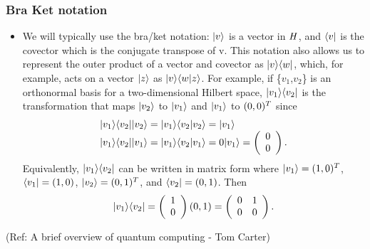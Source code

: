  \begin{frame}[fragile]\frametitle{Bra Ket notation}

\begin{itemize}
	\item We will typically use the bra/ket notation: \newline
		$ |{v}\rangle $ is a vector in $\mathit{H}$, and \newline
		$ \langle{v}| $ is the covector which is the conjugate transpose of v. \newline
		This notation also allows us to represent the outer product of a vector and
		covector as $|{v}\rangle \langle{w}|$, which, for example, acts on a vector $|{z}\rangle$
		as $|{v}\rangle \langle{w}|{z}\rangle$.
		 For example, if \{$v_1$,$v_2$\} is an orthonormal basis for a two-dimensional
		  Hilbert space, $|{v_1}\rangle\langle{v_2}|$ is the transformation
			that maps $|{v_2}\rangle$ to $|{v_1}\rangle$ and $|{v_1}\rangle$ to $(0, 0)^T$ since
			$$\begin{array}{l}
			|{v_1}\rangle\langle{v_2}||{v_2}\rangle = |{v_1}\rangle\langle{v_2}|{v_2}\rangle = |{v_1}\rangle\\
			|{v_1}\rangle\langle{v_2}||{v_1}\rangle = |{v_1}\rangle\langle{v_2}|{v_1}\rangle = 0 |{v_1}\rangle = \left(\begin{array}{c}0\\0\end{array}\right).\\
  			\end{array}$$
			Equivalently, $|{v_1}\rangle\langle{v_2}|$ can be written in matrix form where
			$|{v_1}\rangle = (1, 0)^T$, $\langle{v_1}| = (1, 0)$, $|{v_2}\rangle = (0, 1)^T$,
			 and $\langle{v_2}| = (0, 1)$.
			Then 
			$$|{v_1}\rangle\langle{v_2}| = \left(\begin{array}{c}1\\0\end{array}\right) (0, 1) = 
					\left(\begin{array}{cc}0&1\\0&0\end{array}\right).$$
	\end{itemize}
	
\tiny{(Ref: A brief overview of quantum computing - Tom Carter)}
	
\end{frame}

